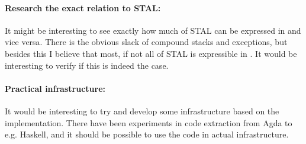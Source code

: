 \paragraph{Research the exact relation to STAL:}
It might be interesting to see exactly how much of STAL can be expressed in
\ATAL and vice versa. There is the obvious slack of compound stacks and
exceptions, but besides this I believe that most, if not all of STAL is
expressible in \ATAL. It would be interesting to verify if this is indeed the
case.

\paragraph{Practical infrastructure:}
It would be interesting to try and develop some infrastructure based on the
implementation. There have been experiments in code extraction from Agda to
e.g. Haskell, and it should be possible to use the code in actual
infrastructure.
